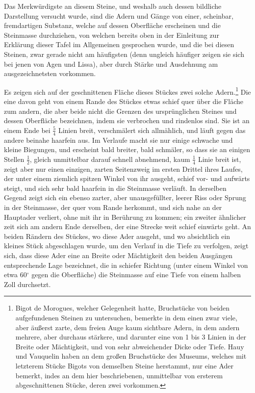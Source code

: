 \documentclass[a4paper, 11pt, oneside, german]{article}
\begin{document}
Das Merkwürdigste an diesem Steine, und weshalb auch dessen bildliche Darstellung versucht wurde, sind die Adern und Gänge von einer, scheinbar, fremdartigen Substanz, welche auf dessen Oberfläche erscheinen und die Steinmasse durchziehen, von welchen bereits oben in der Einleitung zur Erklärung dieser Tafel im Allgemeinen gesprochen wurde, und die bei diesen Steinen, zwar gerade nicht am häufigsten (denn ungleich häufiger zeigen sie sich bei jenen von Agen und Lissa), aber durch Stärke und Ausdehnung am ausgezeichnetsten vorkommen.

Es zeigen sich auf der geschnittenen Fläche dieses Stückes zwei solche Adern.\footnote{Bigot de Morogues, welcher Gelegenheit hatte, Bruchstücke von beiden aufgefundenen Steinen zu untersuchen, bemerkte in dem einen zwar viele, aber äußerst zarte, dem freien Auge kaum sichtbare Adern, in dem andern mehrere, aber durchaus stärkere, und darunter eine von 1 bis 3 Linien in der Breite oder Mächtigkeit, und von sehr abweichender Dicke oder Tiefe. Hauy und Vauquelin haben an dem großen Bruchstücke des Museums, welches mit letzterem Stücke Bigots von demselben Steine herstammt, nur eine Ader bemerkt, indes an dem hier beschriebenen, unmittelbar von ersterem abgeschnittenen Stücke, deren zwei vorkommen.} Die eine davon geht von einem Rande des Stückes etwas schief quer über die Fläche zum andern, die aber beide nicht die Grenzen des ursprünglichen Steines und dessen Oberfläche bezeichnen, indem sie verbrochen und rindenlos sind. Sie ist an einem Ende bei $\frac{5}{4}$ Linien breit, verschmälert sich allmählich, und läuft gegen das andere beinahe haarfein aus. Im Verlaufe macht sie nur einige schwache und kleine Biegungen, und erscheint bald breiter, bald schmäler, so dass sie an einigen Stellen $\frac{1}{2}$, gleich unmittelbar darauf schnell abnehmend, kaum $\frac{1}{4}$ Linie breit ist, zeigt aber nur einen einzigen, zarten Seitenzweig im ersten Drittel ihres Laufes, der unter einem ziemlich spitzen Winkel von ihr ausgeht, schief vor- und aufwärts steigt, und sich sehr bald haarfein in die Steinmasse verläuft. In derselben Gegend zeigt sich ein ebenso zarter, aber unausgefüllter, leerer Riss oder Sprung in der Steinmasse, der quer vom Rande herkommt, und sich nahe an der Hauptader verliert, ohne mit ihr in Berührung zu kommen; ein zweiter ähnlicher zeit sich am andern Ende derselben, der eine Strecke weit schief einwärts geht. An beiden Rändern des Stückes, wo diese Ader ausgeht, und wo absichtlich ein kleines Stück abgeschlagen wurde, um den Verlauf in die Tiefe zu verfolgen, zeigt sich, dass diese Ader eine an Breite oder Mächtigkeit den beiden Ausgängen entsprechende Lage bezeichnet, die in schiefer Richtung (unter einem Winkel von etwa 60$^{\circ}$ gegen die Oberfläche) die Steinmasse auf eine Tiefe von einem halben Zoll durchsetzt.
\end{document}
